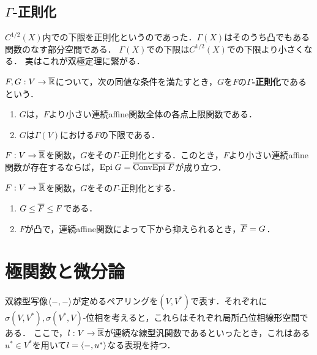 \documentclass[uplatex,dvipdfmx]{jsreport}
\begin{document}
\subsection{$\Gamma$-正則化}

\begin{tcolorbox}[colframe=ForestGreen, colback=ForestGreen!10!white,breakable,colbacktitle=ForestGreen!40!white,coltitle=black,fonttitle=\bfseries\sffamily,
title=]
    $C^{1/2}(X)$内での下限を正則化というのであった．$\Gamma(X)$はそのうち凸でもある関数のなす部分空間である．
    $\Gamma(X)$での下限は$C^{1/2}(X)$での下限より小さくなる．
    実はこれが双極定理に繋がる．
\end{tcolorbox}

\begin{definition}
    $F,G:V\to\overline{\mathbb{R}}$について，次の同値な条件を満たすとき，$G$を$F$の\textbf{$\Gamma$-正則化}であるという．
    \begin{enumerate}
        \item $G$は，$F$より小さい連続affine関数全体の各点上限関数である．
        \item $G$は$\Gamma(V)$における$F$の下限である．
    \end{enumerate}
\end{definition}

\begin{proposition}\label{prop-epigraph-of-gamma-regularization}
    $F:V\to\overline{\mathbb{R}}$を関数，$G$をその$\Gamma$-正則化とする．このとき，$F$より小さい連続affine関数が存在するならば，$\mathrm{Epi}\; G=\overline{\mathrm{Conv}\mathrm{Epi}\; F}$が成り立つ．
\end{proposition}

\begin{proposition}
    $F:V\to\overline{\mathbb{R}}$を関数，$G$をその$\Gamma$-正則化とする．
    \begin{enumerate}
        \item $G\le\overline{F}\le F$である．
        \item $F$が凸で，連続affine関数によって下から抑えられるとき，$\overline{F}=G$．
    \end{enumerate}
\end{proposition}

\section{極関数と微分論}

\begin{notation}
    双線型写像$\langle-,-\rangle$が定めるペアリングを$(V,V^*)$で表す．それぞれに$\sigma(V,V^*),\sigma(V^*,V)$-位相を考えると，これらはそれぞれ局所凸位相線形空間である．
    ここで，$l:V\to\overline{\mathbb{R}}$が連続な線型汎関数であるといったとき，これはある$u^*\in V^*$を用いて$l=\langle-,u^*\rangle$なる表現を持つ．
\end{notation}
\end{document}
